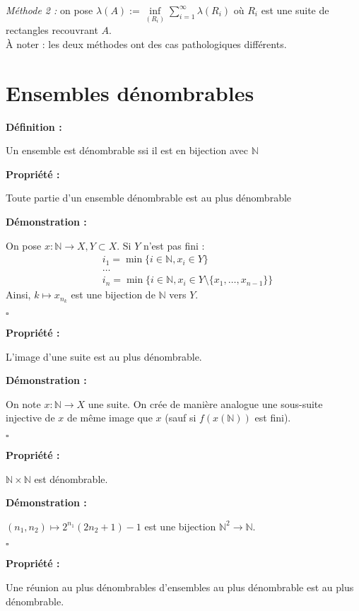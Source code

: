 \documentclass[10pt,a4paper,notitlepage ]{report}
\newenvironment{definition}{
	
	\textbf{Définition : }
}
{}
\newcounter{th}
\newenvironment{propriete}[1][]{
	\begin{tcolorbox}
		\textbf{Propriété #1 : }
}
{\end{tcolorbox}}
\newenvironment{demo}[1][]{

	\textbf{Démonstration #1 :}
}{\begin{flushright}
	$\square$
\end{flushright}
}
\begin{document}
\emph{Méthode 2 :} on pose $\lambda(A) := \underset{(R_i)}{\inf} \sum_{i=1}^{\infty}  \lambda(R_i)$ où $R_i$ est une suite de rectangles recouvrant $A$. \\

À noter : les deux méthodes ont des cas pathologiques différents.

\section{Ensembles dénombrables}

\begin{definition}
	Un ensemble est dénombrable ssi il est en bijection avec $\mathbb N$
\end{definition}
\begin{propriete}
	Toute partie d'un ensemble dénombrable est au plus dénombrable
\end{propriete}
\begin{demo}
	On pose $x : \mathbb N \rightarrow X, Y \subset X$. Si $Y$ n'est pas fini :
	\begin{align*}
	&i_1 = \min \{i\in\mathbb N, x_i \in Y \} \\
	&\dots  \\
 	&i_n = \min \{ i\in \mathbb N, x_i\in Y \setminus\{x_1, \dots,x_{n-1}\}\}
 	\end{align*} 
	Ainsi, $k \mapsto x_{n_k}$ est une bijection de $\mathbb N$ vers $Y$.
\end{demo}

\begin{propriete}
	L'image d'une suite est au plus dénombrable.
\end{propriete}
\begin{demo}
	On note $x:\mathbb N \rightarrow X$ une suite.
On crée de manière analogue une sous-suite injective de $x$ de même image que $x$ (sauf si $f(x(\mathbb N))$ est fini).
\end{demo}
\begin{propriete}
	$\mathbb N \times \mathbb N$ est dénombrable.
\end{propriete}
\begin{demo}
	$(n_1,n_2) \mapsto 2^{n_1} (2n_2+1) -1$ est une bijection $\mathbb N^2 \rightarrow \mathbb N$.
\end{demo}

\begin{propriete}
	Une réunion au plus dénombrables d'ensembles au plus dénombrable est au plus dénombrable.
\end{propriete}
\end{document}
